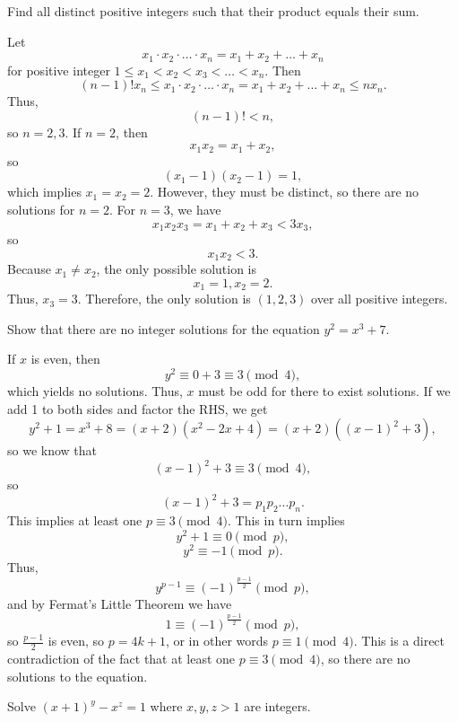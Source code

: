 \documentclass{article}
\begin{document}
\begin{exam}
Find all distinct positive integers such that their product equals their sum.
\end{exam}
\begin{sol}
Let
$$x_1 \cdot x_2 \cdot \ldots \cdot x_n = x_1 + x_2 + \ldots + x_n$$
for positive integer $1\le x_1 < x_2 < x_3 < \ldots < x_n$. Then
$$(n-1)! x_n \le x_1 \cdot x_2 \cdot \ldots \cdot x_n = x_1 + x_2 + \ldots + x_n \le nx_n.$$
Thus,
$$(n-1)! < n,$$
so $n=2,3$. If $n=2$, then
$$x_1x_2 = x_1 + x_2,$$
so
$$(x_1-1)(x_2-1) = 1,$$
which implies $x_1=x_2=2$. However, they must be distinct, so there are no solutions for $n=2$. For $n=3$, we have
$$x_1x_2x_3 = x_1+x_2+x_3<3x_3,$$
so
$$x_1x_2<3.$$
Because $x_1 \neq x_2$, the only possible solution is
$$x_1=1,x_2=2.$$
Thus, $x_3=3$. Therefore, the only solution is $(1,2,3)$ over all positive integers.
\end{sol}
\begin{exam}
Show that there are no integer solutions for the equation $y^2=x^3+7$.
\end{exam}
\begin{sol}
If $x$ is even, then
$$y^2 \equiv 0 + 3 \equiv 3 \pmod{4},$$
which yields no solutions. Thus, $x$ must be odd for there to exist solutions. If we add 1 to both sides and factor the RHS, we get
$$y^2+1 = x^3 + 8 = (x+2)(x^2-2x+4) = (x+2)((x-1)^2+3),$$
so we know that
$$(x-1)^2 + 3 \equiv 3 \pmod{4},$$
so
$$(x-1)^2 + 3 = p_1p_2\ldots p_n.$$
This implies at least one $p\equiv 3\pmod{4}$. This in turn implies
$$y^2+1 \equiv 0 \pmod{p},$$
$$y^2 \equiv -1 \pmod{p}.$$
Thus,
$$y^{p-1} \equiv (-1)^{\frac{p-1}{2}} \pmod{p},$$
and by Fermat's Little Theorem we have
$$1 \equiv (-1)^{\frac{p-1}{2}} \pmod{p},$$
so $\frac{p-1}{2}$ is even, so $p=4k+1$, or in other words $p \equiv 1\pmod{4}$. This is a direct contradiction of the fact that at least one $p\equiv 3\pmod{4}$, so there are no solutions to the equation.
\end{sol}
\begin{exam}
Solve $(x+1)^y - x^z = 1$ where $x,y,z>1$ are integers.
\end{exam}
\end{document}
